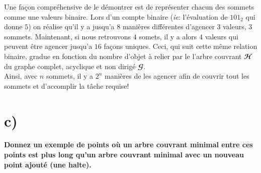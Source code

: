 \documentclass[11pt,a4paper, oneside, oldfontcommands]{memoir}
\newcommand{\G}{$\mathbfcal{G}$}
\begin{document}
Une façon compréhensive de le démontrer est de représenter chacun des sommets comme une valeurs binaire.
Lors d'un compte binaire (\textit{ie}: l'évaluation de $101_2$ qui donne $5$) on réalise qu'il y a jusqu'a $8$ manières différentes d'agencer $3$ valeurs, $3$ sommets.
Maintenant, si nous retrouvons $4$ somets, il y a alors $4$ valeurs qui peuvent être agencer jusqu'a $16$ façons uniques. 
Ceci, qui suit cette même relation binaire, gradue en fonction du nombre d'objet à relier par le l'arbre couvrant $\mathbfcal{H}$ du graphe complet, acyclique et non dirigé \G{}.\\

Ainsi, avec $n$ sommets, il y a $2^n$ manières de les agencer afin de couvrir tout les sommets et d'accomplir la tâche requise!



\section{c)}

\noindent
\begin{siderules}
  \textbf{Donnez un exemple de points où un arbre couvrant minimal entre ces points est plus long qu'un arbre couvrant minimal avec un nouveau point ajouté (une halte).}
\end{siderules}

\begin{figure}[!h]
  \centering
\end{figure}
\end{document}
